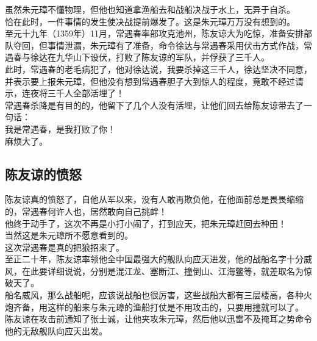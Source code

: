 \begin{multicols}{\theparacolNo}
虽然朱元璋不懂物理，但他也知道拿渔船去和战船决战于水上，无异于自杀。\\

恰在此时，一件事情的发生使决战提前爆发了。这是朱元璋万万没有想到的。\\

至元十九年（1359年）11月，常遇春率部攻克池州，陈友谅大为吃惊，准备安排部队夺回，但事情泄漏，朱元璋有了准备，命令徐达与常遇春采用伏击方式作战，常遇春与徐达在九华山下设伏，打败了陈友谅的军队，并俘获了三千人。\\

此时，常遇春的老毛病犯了，他对徐达说，我要杀掉这三千人，徐达坚决不同意，并表示要上报朱元璋，但他没有想到常遇春胆子大到惊人的程度，竟敢不经过请示，连夜将三千人全部活埋了！\\

常遇春杀降是有目的的，他留下了几个人没有活埋，让他们回去给陈友谅带去了一句话：\\

我是常遇春，是我打败了你！\\

麻烦大了。\\

\subsection{陈友谅的愤怒}
陈友谅真的愤怒了，自他从军以来，没有人敢再欺负他，在他面前总是畏畏缩缩的，常遇春何许人也，居然敢向自己挑衅！\\

他终于动手了，这次不再是小打小闹了，打到应天，把朱元璋赶回去种田！\\

当然这是朱元璋所不愿意看到的。\\

这次常遇春是真的把狼招来了。\\

至正二十年，陈友谅率领他全中国最强大的舰队向应天进发，他的战船名字十分威风，在此要详细说说，分别是混江龙、塞断江、撞倒山、江海鳖等，就差取名为惊破天了。\\

船名威风，那么战船呢，应该说战船也很厉害，这些战船大都有三层楼高，各种火炮齐备，用这样的船来与朱元璋的渔船打仗是不用攻击的，只要用撞就可以了。\\

陈友谅在攻击前通知了张士诚，让他夹攻朱元璋，然后他以迅雷不及掩耳之势命令他的无敌舰队向应天出发。\\


\end{multicols}
